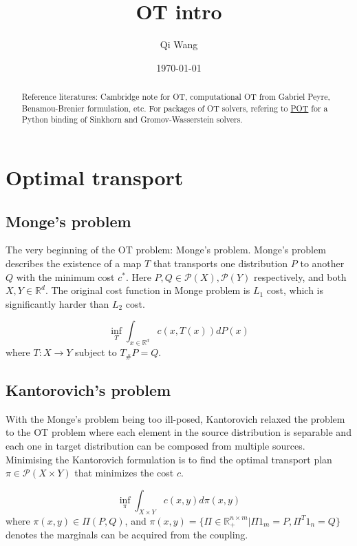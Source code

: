 \documentclass{article}
\title{OT intro}
\author{Qi Wang}
\date{\today}
\begin{document}
\maketitle

\begin{abstract}
   Reference literatures: Cambridge note for OT, computational OT from Gabriel Peyre, Benamou-Brenier formulation, etc. For packages of OT solvers, refering to \href{https://github.com/PythonOT/POT}{POT} for a Python binding of Sinkhorn and Gromov-Wasserstein solvers.
\end{abstract}

\section{Optimal transport}
\subsection{Monge's problem}
The very beginning of the OT problem: Monge's problem. Monge's problem describes the existence of a map $T$ that transports one distribution $P$ to another $Q$ with the minimum cost $c^*$. Here $P,Q \in \mathcal{P}(X), \mathcal{P}(Y)$ respectively, and  both $X,Y \in \mathbb{R}^{d}$. The original cost function in Monge problem is $L_{1}$ cost, which is significantly harder than $L_{2}$ cost.

\begin{equation}
    \inf_{T} \int_{x\in \mathbb{R}^{d}} c(x, T(x)) dP(x)
\end{equation}
where $T: X \rightarrow Y$ subject to $T_{\#}P = Q$. 


\subsection{Kantorovich's problem}
With the Monge's problem being too ill-posed, Kantorovich relaxed the problem to the OT problem where each element in the source distribution is separable and each one in target distribution can be composed from multiple sources. Minimising the Kantorovich formulation is to find the optimal transport plan $\pi \in \mathcal{P}(X \times Y)$ that minimizes the cost $c$.

\begin{equation}
    \inf_{\pi} \int_{X \times Y} c(x,y) d\pi(x,y)
\end{equation}
where $\pi(x,y) \in \Pi(P, Q)$, and $\pi(x,y) = \{\Pi \in \mathbb{R}^{n\times m}_{+} | \Pi1_{m} = P, \Pi^{T}1_{n} = Q\}$ denotes the marginals can be acquired from the coupling.
\end{document}
